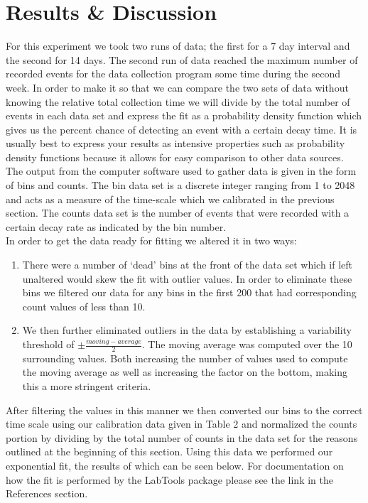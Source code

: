 \section{Results \& Discussion}
\indent \indent For this experiment we took two runs of data; the first for a 7 day interval and the second for 14 days.  The second run of data reached the maximum number of recorded events for the data collection program some time during the second week. In order to make it so that we can compare the two sets of data without knowing the relative total collection time we will divide by the total number of events in each data set and express the fit as a probability density function which gives us the percent chance of detecting an event with a certain decay time. It is usually best to express your results as intensive properties such as probability density functions because it allows for easy comparison to other data sources.\\
\indent \indent The output from the computer software used to gather data is given in the form of bins and counts.  The bin data set is a discrete integer ranging from 1 to 2048 and acts as a measure of the time-scale which we calibrated in the previous section.  The counts data set is the number of events that were recorded with a certain decay rate as indicated by the bin number.\\
\indent \indent In order to get the data ready for fitting we altered it in two ways:
\begin{enumerate}
\item There were a number of `dead' bins at the front of the data set which if left unaltered would skew the fit with outlier values.  In order to eliminate these bins we filtered our data for any bins in the first 200 that had corresponding count values of less than 10.  
\item We then further eliminated outliers in the data by establishing a variability threshold of $\pm \frac{moving-average}{2}$.  The moving average was computed over the 10 surrounding values.  Both increasing  the number of values used to compute the moving average as well as increasing the factor on the bottom, making this a more stringent criteria.
\end{enumerate}
\indent \indent After filtering the values in this manner we then converted our bins to the correct time scale using our calibration data given in Table 2 and normalized the counts portion by dividing by the total number of counts in the data set for the reasons outlined at the beginning of this section. Using this data we performed our exponential fit, the results of which can be seen below. For documentation on how the fit is performed by the LabTools package please see the link in the References section.
